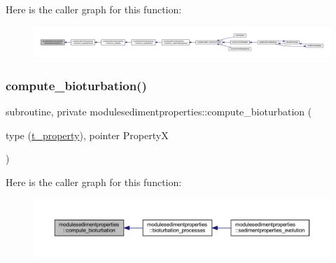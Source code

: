 Here is the caller graph for this function\+:\nopagebreak
\begin{figure}[H]
\begin{center}
\leavevmode
\includegraphics[width=350pt]{namespacemodulesedimentproperties_aed9da5330d31cd4f61d7b60492c4d0ad_icgraph}
\end{center}
\end{figure}
\mbox{\label{namespacemodulesedimentproperties_ae53733a5fdfd90feccc3a7f557e05cc9}} 
\subsubsection{\texorpdfstring{compute\+\_\+bioturbation()}{compute\_bioturbation()}}
{\footnotesize\ttfamily subroutine, private modulesedimentproperties\+::compute\+\_\+bioturbation (\begin{DoxyParamCaption}\item[{type (\mbox{\hyperlink{structmodulesedimentproperties_1_1t__property}{t\+\_\+property}}), pointer}]{PropertyX }\end{DoxyParamCaption})\hspace{0.3cm}{\ttfamily [private]}}

Here is the caller graph for this function\+:\nopagebreak
\begin{figure}[H]
\begin{center}
\leavevmode
\includegraphics[width=350pt]{namespacemodulesedimentproperties_ae53733a5fdfd90feccc3a7f557e05cc9_icgraph}
\end{center}
\end{figure}
\mbox{\label{namespacemodulesedimentproperties_a1bb06862669d539399995d64ea159fde}} 
